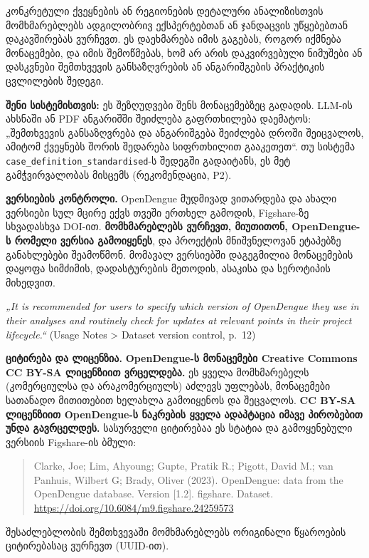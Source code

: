 \documentclass[11pt,a4paper]{article}
\newcommand{\imp}[1]{\textbf{\color{importred}#1}}
\begin{document}
კონკრეტული ქვეყნების ან რეგიონების დეტალური ანალიზისთვის მომხმარებლებს ადგილობრივ ექსპერტებთან ან ჯანდაცვის უწყებებთან
დაკავშირებას ვურჩევთ. ეს დაეხმარება იმის გაგებას, როგორ იქმნება მონაცემები, და იმის შემოწმებას, ხომ არ არის დაკვირვებული
ნიმუშები ან დასკვნები შემთხვევის განსაზღვრების ან ანგარიშგების პრაქტიკის ცვლილების შედეგი.

\begin{etl}
\textbf{შენი სისტემისთვის:} ეს შეზღუდვები შენს მონაცემებზეც გადადის. LLM-ის ახსნაში ან PDF ანგარიშში შეიძლება გაფრთხილება დაემატოს:
„შემთხვევის განსაზღვრება და ანგარიშგება შეიძლება დროში შეიცვალოს, ამიტომ ქვეყნებს შორის შედარება სიფრთხილით გააკეთეთ“.
თუ სისტემა \texttt{case\_definition\_standardised}-ს შედეგში გადაიტანს, ეს მეტ გამჭვირვალობას მისცემს (რეკომენდაცია, P2).
\end{etl}

\textbf{ვერსიების კონტროლი.} OpenDengue მუდმივად ვითარდება და ახალი ვერსიები სულ მცირე ექვს თვეში ერთხელ გამოდის, Figshare-ზე
სხვადასხვა DOI-ით. \imp{მომხმარებლებს ვურჩევთ, მიუთითონ, OpenDengue-ს რომელი ვერსია გამოიყენეს}, და პროექტის მნიშვნელოვან
ეტაპებზე განახლებები შეამოწმონ. მომავალ ვერსიებში დაგეგმილია მონაცემების დაყოფა სიმძიმის, დადასტურების მეთოდის, ასაკისა და
სეროტიპის მიხედვით.

\begin{citat}
\textit{„It is recommended for users to specify which version of OpenDengue they use in their analyses and routinely check for updates at relevant points in their project lifecycle.“} (Usage Notes > Dataset version control, p.~12)
\end{citat}

\textbf{ციტირება და ლიცენზია.} \imp{OpenDengue-ს მონაცემები Creative Commons CC BY-SA ლიცენზიით ვრცელდება.} ეს ყველა მომხმარებელს
(კომერციულსა და არაკომერციულს) აძლევს უფლებას, მონაცემები სათანადო მითითებით ხელახლა გამოიყენოს და შეცვალოს.
\imp{CC BY-SA ლიცენზიით OpenDengue-ს ნაკრების ყველა ადაპტაცია იმავე პირობებით უნდა გავრცელდეს.} სასურველი ციტირებაა ეს სტატია
და გამოყენებული ვერსიის Figshare-ის ბმული:

\begin{quote}\small
Clarke, Joe; Lim, Ahyoung; Gupte, Pratik R.; Pigott, David M.; van Panhuis, Wilbert G; Brady, Oliver (2023). OpenDengue: data from the
OpenDengue database. Version [1.2]. figshare. Dataset. \url{https://doi.org/10.6084/m9.figshare.24259573}
\end{quote}
შესაძლებლობის შემთხვევაში მომხმარებლებს ორიგინალი წყაროების ციტირებასაც ვურჩევთ (UUID-ით).
\end{document}
